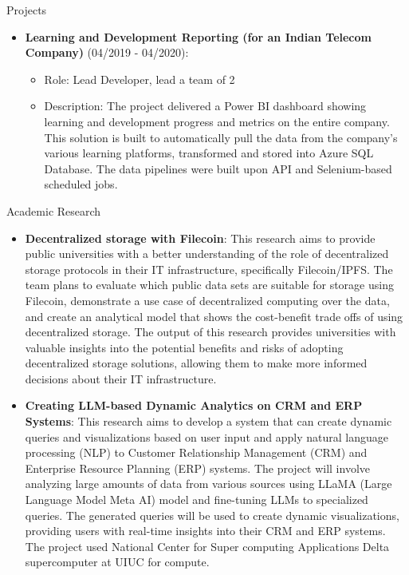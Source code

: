 \documentclass{resume} %
\begin{document}
\begin{rSection}{Projects}
        \begin{itemize}
            \item \textbf{Learning and Development Reporting (for an Indian Telecom Company)} (04/2019 - 04/2020):
            \begin{itemize}
                \item Role: Lead Developer, lead a team of 2
                \item Description: The project delivered a Power BI dashboard showing learning and development progress and metrics on the entire company. This solution is built to automatically pull the data from the company's various learning platforms, transformed and stored into Azure SQL Database. The data pipelines were built upon API and Selenium-based scheduled jobs.
            \end{itemize}
        \end{itemize}
        
    \end{rSection}
    
    
    \begin{rSection}{Academic Research}
        \begin{itemize}
            \item \textbf{Decentralized storage with Filecoin}: This research aims to provide public universities with a better understanding of the role of decentralized storage protocols in their IT infrastructure, specifically Filecoin/IPFS. The team plans to evaluate which public data sets are suitable for storage using Filecoin, demonstrate a use case of decentralized computing over the data, and create an analytical model that shows the cost-benefit trade offs of using decentralized storage. The output of this research provides universities with valuable insights into the potential benefits and risks of adopting decentralized storage solutions, allowing them to make more informed decisions about their IT infrastructure.
            \item \textbf{Creating LLM-based Dynamic Analytics on CRM and ERP Systems}: This research aims to develop a system that can create dynamic queries and visualizations based on user input and apply natural language processing (NLP) to Customer
            Relationship Management (CRM) and Enterprise Resource Planning (ERP) systems. The project 
            will involve analyzing large amounts of data from various sources using LLaMA (Large 
            Language Model Meta AI) model and fine-tuning LLMs to specialized queries. The generated 
            queries will be used to create dynamic visualizations, providing users with real-time insights 
            into their CRM and ERP systems. The project used National Center for Super computing Applications Delta supercomputer at UIUC for compute.
        \end{itemize}
    \end{rSection}
    
\end{document}
